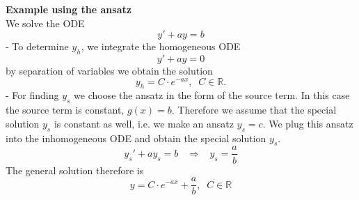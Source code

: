 \textbf{Example using the ansatz}\\
We solve the ODE
\begin{equation}
  y' + ay = b
\end{equation}
- To determine $y_h$, we integrate the homogeneous ODE
\begin{equation}
  y' + ay = 0
\end{equation}
by separation of variables we obtain the solution
\begin{equation}
  y_h = C \cdot e^{-ax}, \;\; C \in \mathbb{R}.
\end{equation}
- For finding $y_s$ we choose the ansatz in the form of the source term. In this case the source term is constant, $g(x) = b$. Therefore we assume that the special solution $y_s$ is constant as well, i.e. we make an ansatz $y_s = c$. We plug this ansatz into the inhomogeneous ODE and obtain the special solution $y_s$.
\begin{equation}
  y_s'+ay_s = b \;\;\; \Rightarrow \;\;\; y_s = \frac{a}{b}
\end{equation}
The general solution therefore is
\begin{equation}
  y = C \cdot e^{-ax} + \frac{a}{b}, \;\; C \in \mathbb{R}
\end{equation}

